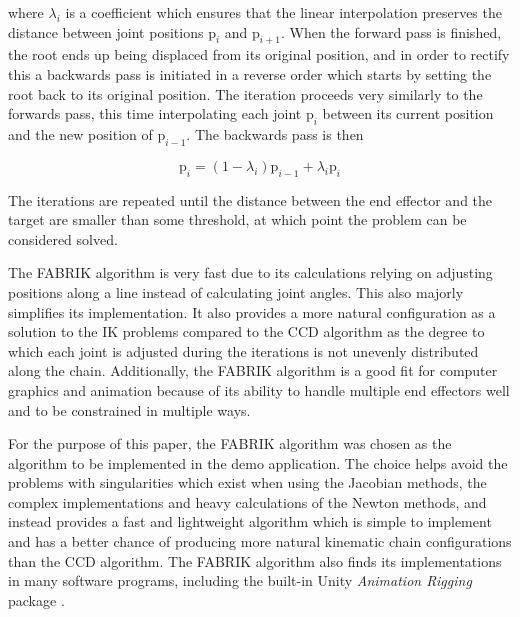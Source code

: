 where \(\lambda_i\) is a coefficient which ensures that the linear interpolation
preserves the distance between joint positions \(\mbox{p}_i\) and
\(\mbox{p}_{i+1}\). When the forward pass is finished, the root ends up being
displaced from its original position, and in order to rectify this a backwards
pass is initiated in a reverse order which starts by setting the root back to
its original position. The iteration proceeds very similarly to the forwards
pass, this time interpolating each joint \(\mbox{p}_i\) between its current
position and the new position of \(\mbox{p}_{i-1}\). The backwards pass is then

\begin{equation}
    \mbox{p}_i = (1 - \lambda_i)\mbox{p}_{i-1} + \lambda_i \mbox{p}_i
\end{equation}

The iterations are repeated until the distance between the end effector and the
target are smaller than some threshold, at which point the problem can be
considered solved.

The FABRIK algorithm is very fast due to its calculations relying on adjusting
positions along a line instead of calculating joint angles. This also majorly
simplifies its implementation. It also provides a more natural configuration as
a solution to the IK problems compared to the CCD algorithm as the degree to
which each joint is adjusted during the iterations is not unevenly distributed
along the chain. Additionally, the FABRIK algorithm is a good fit for computer
graphics and animation because of its ability to handle multiple end effectors
well and to be constrained in multiple ways.

For the purpose of this paper, the FABRIK algorithm was chosen as the
algorithm to be implemented in the demo application. The choice helps avoid the
problems with singularities which exist when using the Jacobian methods, the
complex implementations and heavy calculations of the Newton methods, and
instead provides a fast and lightweight algorithm which is simple to implement
and has a better chance of producing more natural kinematic chain configurations
than the CCD algorithm. The FABRIK algorithm also finds its implementations in
many software programs, including the built-in Unity \textit{Animation Rigging}
package \cite{unity_animation_rigging}.

